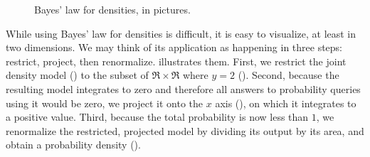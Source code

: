 \begin{figure}[tbp]
\tab
{}
\caption[Bayes' law for densities, in pictures]{Bayes' law for densities, in pictures.}
\label{fig:bayes-densities}
\end{figure}

While using Bayes' law for densities is difficult, it is easy to visualize, at least in two dimensions.
We may think of its application as happening in three steps: restrict, project, then renormalize.
 illustrates them.
First, we restrict the joint density model () to the subset of $\Re \times \Re$ where $y = 2$ ().
Second, because the resulting model integrates to zero and therefore all answers to probability queries using it would be zero, we project it onto the $x$ axis (), on which it integrates to a positive value.
Third, because the total probability is now less than $1$, we renormalize the restricted, projected model by dividing its output by its area, and obtain a probability density ().

